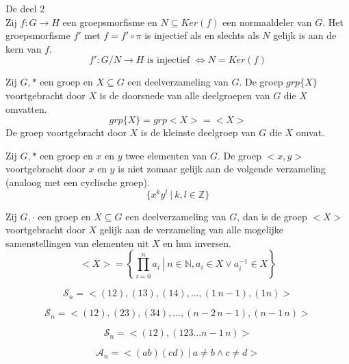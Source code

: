 \documentclass[main.tex]{subfiles}
\begin{document}
\begin{st}
De  deel 2\\
Zij $f: G\rightarrow H$ een groepsmorfisme en $N\subseteq Ker(f)$ een normaaldeler van $G$.
Het groepsmorfisme $f'$ met $f = f'\circ \pi$ is injectief als en slechts als $N$ gelijk is aan de kern van $f$.
\[ f':G/N \rightarrow H \text{ is injectief } \Leftrightarrow N = Ker(f) \]
\end{st}

\begin{de}
Zij $G,*$ een groep en $X \subseteq G$ een deelverzameling van $G$.
De groep $grp\{X\}$ voortgebracht door $X$ is de doorsnede van alle deelgroepen van $G$ die $X$ omvatten. 
\[ grp\{X\} = grp<X> = <X> \]
De groep voortgebracht door $X$ is de kleinste deelgroep van $G$ die $X$ omvat.
\end{de}

\begin{opm}
Zij $G,*$ een groep en $x$ en $y$ twee elementen van $G$.
De groep $<x,y>$ voortgebracht door $x$ en $y$ is niet zomaar gelijk aan de volgende verzameling (analoog met een cyclische groep).
\[ \{ x^{k}y^{l}\ |\ k,l\in \mathbb{Z} \} \]
\end{opm}

\begin{ei}
Zij $G,\cdot$ een groep en $X \subseteq G$ een deelverzameling van $G$, dan is de groep $<X>$ voortgebracht door $X$ gelijk aan de verzameling van alle mogelijke samenstellingen van elementen uit $X$ en hun inversen.
\[ <X> = \left\{ \prod_{i=0}^{n}a_{i} \ \left|\ n\in \mathbb{N}, a_{i}\in X \vee a_{i}^{-1} \in X \right.\right\}\]
\end{ei}

\begin{pr}
\[ \mathcal{S}_n = <(12),(13),(14),\dotsc, (1\, n-1), (1n)> \]
\end{pr}

\begin{pr}
\[ \mathcal{S}_n = <(12),(23),(34),\dotsc, (n-2\, n-1), (n-1\,n)> \]
\end{pr}

\begin{pr}
\[ \mathcal{S}_n = <(12), (123\dotsc n-1\,n)> \]
\end{pr}

\begin{pr}
\[ \mathcal{A}_n = <(ab)(cd)\ |\ a\neq b \wedge c \neq d> \]
\end{pr}
\end{document}

